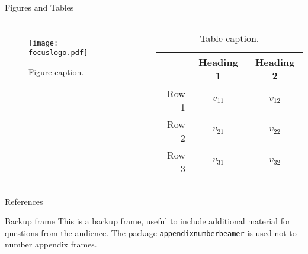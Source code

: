 \documentclass[aspectratio=169]{beamer}
\begin{document}
    \begin{frame}{Figures and Tables}
        \begin{columns}
                \begin{figure}
                    \centering
                    \texttt{[image: focuslogo.pdf]}
                    \caption{Figure caption.}
                    \label{fig:focuslogo}
                \end{figure}
                
                \begin{table}
                    \centering
                    \begin{tabular}{rcc}
                         & Heading 1 & Heading 2 \\\hline
                        Row 1 & \(v_{11}\) & \(v_{12}\) \\
                        Row 2 & \(v_{21}\) & \(v_{22}\) \\
                        Row 3 & \(v_{31}\) & \(v_{32}\) \\
                    \end{tabular}
                    \caption{Table caption.}
                    \label{tab:demo}
                \end{table}
        \end{columns}
    \end{frame}
    
    \begin{frame}[focus]
    \end{frame}
    
    \appendix
    \begin{frame}{References}
        \nocite{*}
        
        
    \end{frame}
    
    \begin{frame}{Backup frame}
        This is a backup frame, useful to include additional material for questions from the audience.
        \vfill
        The package \texttt{appendixnumberbeamer} is used not to number appendix frames.
    \end{frame}
\end{document}
